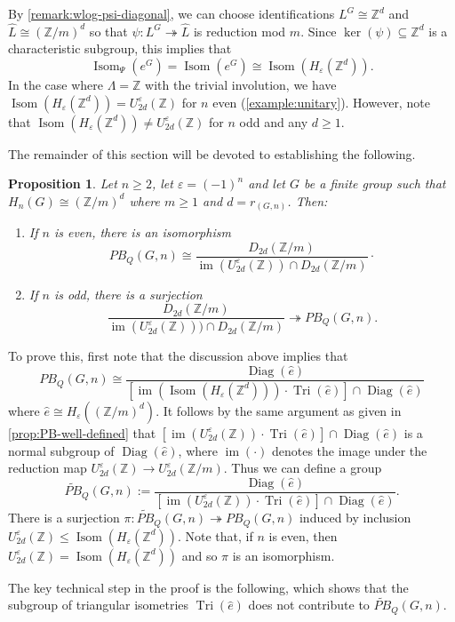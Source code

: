 \documentclass[11pt,a4paper,leqno]{amsart}
\newtheorem{proposition}[theorem]{Proposition}
\theoremstyle{definition}
\theoremstyle{remark}
\newenvironment{clist}[1]
{\begin{enumerate}[\normalfont #1]}
{\end{enumerate}}
\newcommand{\wh}{\widehat}
\newcommand{\wt}{\widetilde}
\newcommand{\Z}{\mathbb{Z}}
\DeclareMathOperator{\IM}{im}
\DeclareMathOperator{\Isom}{Isom}
\DeclareMathOperator{\DiagIsom}{Diag}
\DeclareMathOperator{\TriIsom}{Tri}
\renewcommand{\L}{L}
\renewcommand{\l}{\Lambda}
\newcommand{\ep}{\varepsilon}
\newcommand{\U}{U^{\varepsilon}}
\begin{document}
 By \cref{remark:wlog-psi-diagonal}, we can choose identifications $\L^G \cong \Z^d$ and $\wh \L \cong (\Z/m)^d$ so that $\psi\colon  L^G \twoheadrightarrow \wh L$ is reduction mod $m$.
 Since $\ker(\psi) \subseteq \Z^d$ is a characteristic subgroup, this implies that
\[ \Isom_{\Psi}(e^G) = \Isom(e^G) \cong \Isom(H_\ep(\Z^d)).\] 
In the case where $\l = \Z$ with the trivial involution, we have $\Isom(H_\ep(\Z^d)) = \U_{2d}(\Z)$ for $n$ even (\cref{example:unitary}). However, note that $\Isom(H_\ep(\Z^d)) \ne \U_{2d}(\Z)$ for $n$ odd and any $d \ge 1$.

The remainder of this section will be devoted to establishing the following.

\begin{proposition} \label{thm:PB-H_2-elementary}
Let $n \ge 2$, let $\varepsilon=(-1)^n$ and let $G$ be a finite group such that $H_n(G) \cong (\Z/m)^d$ where $m \ge 1$ and $d = r_{(G,n)}$. Then:
\begin{clist}{(i)}
\item If $n$ is even, there is 
an isomorphism
\[ PB_Q(G,n) \cong \frac{D_{2d}(\Z/m)}{\IM{(\U_{2d}(\Z))} \cap D_{2d}(\Z/m)} \cdot \]
\item If $n$ is odd,  there is a surjection 
$$\frac{D_{2d}(\Z/m)}{\IM(\U_{2d}(\Z))) \cap D_{2d}(\Z/m)} \twoheadrightarrow PB_Q(G,n).$$ 
\end{clist}
\end{proposition}

To prove this, first note that the discussion above implies that
\[ PB_Q(G,n) \cong \frac{\DiagIsom(\wh e)}{[\IM(\Isom(H_\ep(\Z^d))) \cdot \TriIsom(\wh e)] \cap \DiagIsom(\wh e)} \]
where $\wh e \cong H_\ep((\Z/m)^d)$.
It follows by the same argument as given in \cref{prop:PB-well-defined} that 
$[\IM(\U_{2d}(\Z)) \cdot \TriIsom(\wh e)] \cap \DiagIsom(\wh e)$ is a normal subgroup of $\DiagIsom(\wh e)$, where $\IM(\cdot)$ denotes the image under the reduction map $\U_{2d}(\Z) \to \U_{2d}(\Z/m)$. 
Thus we can define a group
\[ \wt{PB}_Q(G,n) := \frac{\DiagIsom(\wh e)}{[\IM(\U_{2d}(\Z)) \cdot \TriIsom(\wh e)] \cap \DiagIsom(\wh e)}.\]
There is a surjection $\pi: \wt{PB}_Q(G,n) \twoheadrightarrow PB_Q(G,n)$ induced by inclusion $\U_{2d}(\Z) \le \Isom(H_\ep(\Z^d))$. Note that, if $n$ is even, then $\U_{2d}(\Z) = \Isom(H_\ep(\Z^d))$ and so $\pi$ is an isomorphism.

The key technical step in the proof is the following, which shows that the subgroup of triangular isometries $\TriIsom(\wh e)$ does not contribute to $\wt{PB}_Q(G,n)$.
\end{document}
